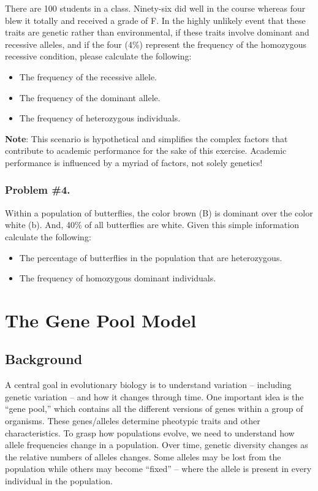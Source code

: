 \documentclass[
  a4paper]{book}
\providecommand{\tightlist}{%
  \setlength{\itemsep}{0pt}\setlength{\parskip}{0pt}}
\begin{document}
There are 100 students in a class. Ninety-six did well in the course whereas four blew it totally and received a grade of F. In the highly unlikely event that these traits are genetic rather than environmental, if these traits involve dominant and recessive alleles, and if the four (4\%) represent the frequency of the homozygous recessive condition, please calculate the following:

\begin{itemize}
\tightlist
\item
  The frequency of the recessive allele.
\item
  The frequency of the dominant allele.
\item
  The frequency of heterozygous individuals.
\end{itemize}

\textbf{Note}: This scenario is hypothetical and simplifies the complex factors that contribute to academic performance for the sake of this exercise. Academic performance is influenced by a myriad of factors, not solely genetics!

\subsection{Problem \#4.}\label{problem-4.}

Within a population of butterflies, the color brown (B) is dominant over the color white (b). And, 40\% of all butterflies are white. Given this simple information calculate the following:

\begin{itemize}
\tightlist
\item
  The percentage of butterflies in the population that are heterozygous.
\item
  The frequency of homozygous dominant individuals.
\end{itemize}

\chapter{The Gene Pool Model}\label{the-gene-pool-model}

\section{Background}\label{background-12}

A central goal in evolutionary biology is to understand variation -- including genetic variation -- and how it changes through time. One important idea is the ``gene pool,'' which contains all the different versions of genes within a group of organisms. These genes/alleles determine pheotypic traits and other characteristics. To grasp how populations evolve, we need to understand how allele frequencies change in a population. Over time, genetic diversity changes as the relative numbers of alleles changes. Some alleles may be lost from the population while others may become ``fixed'' -- where the allele is present in every individual in the population.
\end{document}
